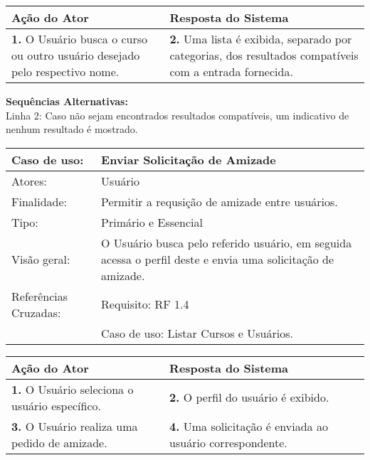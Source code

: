 \documentclass[12pt,a4paper,onecolumn,titlepage]{article}
\begin{document}
\begin{center}
\def\arraystretch{1.1}
\begin{tabular}{|p{6cm}|p{6cm}|}

\hline
\textbf{Ação do Ator} & \textbf{Resposta do Sistema} \\ \hline
\textbf{1.} O Usuário busca o curso ou outro usuário desejado pelo respectivo nome. & \textbf{2.} Uma lista é exibida, separado por categorias, dos resultados compatíveis com a entrada fornecida. \\ \hline
\end{tabular}
\end{center}

\textbf{Sequências Alternativas:}\\
Linha 2: Caso não sejam encontrados resultados compatíveis, um indicativo de nenhum resultado é mostrado.
\newpage


\begin{table}[h!]
\begin{center}
\begin{tabular}{p{2.5cm} p{9.5cm}}
Caso de uso: & \textbf{Enviar Solicitação de Amizade} \\ \hline
Atores: & Usuário \\ \hline
Finalidade: & Permitir a requsição de amizade entre usuários. \\ \hline
Tipo: & Primário e Essencial \\ \hline
Visão geral: & O Usuário busca pelo referido usuário, em seguida acessa o perfil deste e envia uma solicitação de amizade. \\ \hline
Referências Cruzadas: & Requisito: RF 1.4 \\ & Caso de uso: Listar Cursos e Usuários.
\end{tabular}
\end{center}
\end{table}


\begin{center}
\def\arraystretch{1.1}
\begin{tabular}{|p{6cm}|p{6cm}|}

\hline
\textbf{Ação do Ator} & \textbf{Resposta do Sistema} \\ \hline
\textbf{1.} O Usuário seleciona o usuário específico. & \textbf{2.} O perfil do usuário é exibido. \\ \hline
\textbf{3.} O Usuário realiza uma pedido de amizade. & \textbf{4.} Uma solicitação é enviada ao usuário correspondente. \\ \hline
\end{tabular}
\end{center}
\end{document}
